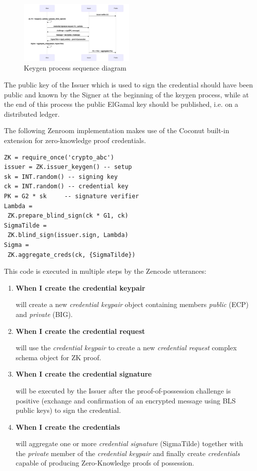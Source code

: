 \documentclass[twocolumn]{article}
\begin{document}
\begin{figure}
  \caption{Keygen process sequence diagram}
  \label{fig:keygen}
  \centering
  \includegraphics[width=0.5\textwidth]{keygen-seq.png}
\end{figure}

The public key of the Issuer which is used to sign the credential
should have been public and known by the Signer at the beginning of
the keygen process, while at the end of this process the public
ElGamal key should be published, i.e. on a distributed ledger.

The following Zenroom implementation makes use of the Coconut
built-in extension for zero-knowledge proof credentials.

\begin{lstlisting}[basicstyle=\tiny,style=lua]
ZK = require_once('crypto_abc')
issuer = ZK.issuer_keygen() -- setup
sk = INT.random() -- signing key
ck = INT.random() -- credential key
PK = G2 * sk     -- signature verifier
Lambda =
 ZK.prepare_blind_sign(ck * G1, ck)
SigmaTilde =
 ZK.blind_sign(issuer.sign, Lambda)
Sigma =
 ZK.aggregate_creds(ck, {SigmaTilde})
\end{lstlisting}

This code is executed in multiple steps by the Zencode utterances:

\begin{enumerate}

\item \textbf{When I create the credential keypair}

  will create a new \emph{credential keypair} object containing
  members \emph{public} (ECP) and \emph{private} (BIG).

\item \textbf{When I create the credential request}

  will use the \emph{credential keypair} to create a new
  \emph{credential request} complex schema object for ZK proof.

\item \textbf{When I create the credential signature}

  will be executed by the Issuer after the proof-of-possession
  challenge is positive (exchange and confirmation of an encrypted
  message using BLS public keys) to sign the credential.

\item \textbf{When I create the credentials}

  will aggregate one or more \emph{credential signature} (SigmaTilde)
  together with the \emph{private} member of the \emph{credential
    keypair} and finally create \emph{credentials} capable of
  producing Zero-Knowledge proofs of possession.

\end{enumerate}
\end{document}
